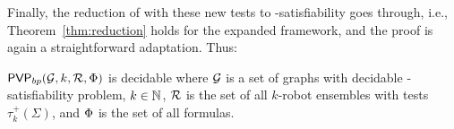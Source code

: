 Finally, the reduction of \RLTL with these new tests to \msol-satisfiability goes through, i.e., Theorem~\ref{thm:reduction} holds for the expanded framework, and the proof is again a straightforward adaptation. Thus:
\begin{theorem} \label{thm:PVPdec-exploration}
$\mathsf{PVP}_{bp}({\mathcal{G},k,\mathcal{R},\Phi})$ is decidable where $\mathcal{G}$ is a set of graphs with decidable \msol-satisfiability problem,
$k \in \mathbb{N}$, $\mathcal{R}$ is the set of all $k$-robot ensembles with tests $\tau^+_k(\Sigma)$, and $\Phi$ is the set of all \RLTLV formulas.
\end{theorem}






